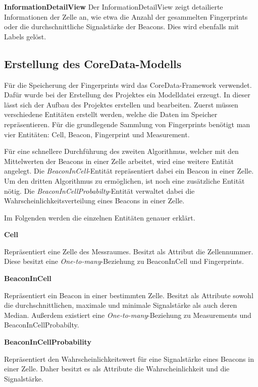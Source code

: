\textbf{InformationDetailView}
Der InformationDetailView zeigt detailierte Informationen der Zelle an, wie etwa die Anzahl der gesammelten Fingerprints oder die durchschnittliche Signalstärke der Beacons.
Dies wird ebenfalls mit Labels gelöst.


\subsection{Erstellung des CoreData-Modells}
\label{sec:}
Für die Speicherung der Fingerprints wird das CoreData-Framework verwendet. Dafür wurde bei der Erstellung des Projektes ein Modelldatei erzeugt. In dieser lässt sich der Aufbau des Projektes erstellen und bearbeiten.
Zuerst müssen verschiedene Entitäten erstellt werden, welche die Daten im Speicher repräsentieren.
Für die grundlegende Sammlung von Fingerprints benötigt man vier Entitäten: Cell, Beacon, Fingerprint und Measurement.

Für eine schnellere Durchführung des zweiten Algorithmus, welcher mit den Mittelwerten der Beacons in einer Zelle arbeitet, wird eine weitere Entität angelegt. Die \emph{BeaconInCell}-Entität repräsentiert dabei ein Beacon in einer Zelle.
Um den dritten Algorithmus zu ermöglichen, ist noch eine zusätzliche Entität nötig. Die \emph{BeaconInCellProbabilty}-Entität verwaltet dabei die Wahrscheinlichkeitsverteilung eines Beacons in einer Zelle.

Im Folgenden werden die einzelnen Entitäten genauer erklärt.


\textbf{Cell}

Repräsentiert eine Zelle des Messraumes. Besitzt als Attribut die Zellennummer.
Diese besitzt eine \emph{One-to-many}-Beziehung zu BeaconInCell und Fingerprints.


\textbf{BeaconInCell}

Repräsentiert ein Beacon in einer bestimmten Zelle. Besitzt als Attribute sowohl die durchschnittlichen, maximale und minimale Signalstärke als auch deren Median.
Außerdem existiert eine \emph{One-to-many}-Beziehung zu Measurements und BeaconInCellProbabilty.



\textbf{BeaconInCellProbability}

Repräsentiert den Wahrscheinlichkeitswert für eine Signalstärke eines Beacons in einer Zelle.
Daher besitzt es als Attribute die Wahrscheinlichkeit und die Signalstärke.


